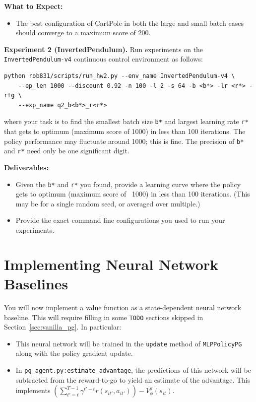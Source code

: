 \documentclass{article}
\begin{document}
\textbf{What to Expect:}
\begin{itemize}
\item The best configuration of CartPole in both the large and small batch cases should converge to a maximum score of 200.
\end{itemize}


\vspace{0.1in}
\textbf{Experiment 2 (InvertedPendulum).} Run experiments on the \verb|InvertedPendulum-v4| continuous control environment as follows:
\begin{lstlisting}
python rob831/scripts/run_hw2.py --env_name InvertedPendulum-v4 \
    --ep_len 1000 --discount 0.92 -n 100 -l 2 -s 64 -b <b*> -lr <r*> -rtg \
    --exp_name q2_b<b*>_r<r*>
\end{lstlisting}

where your task is to find the smallest batch size \texttt{b*} and largest learning rate \texttt{r*} that gets to optimum (maximum score of 1000) in less than 100 iterations. The policy performance may fluctuate around 1000; this is fine. The precision of \texttt{b*} and \texttt{r*} need only be one significant digit.

\textbf{Deliverables:}

\begin{itemize}
\item Given the \texttt{b*} and \texttt{r*} you found, provide a learning curve where the policy gets to optimum (maximum score of ~1000) in less than 100 iterations. (This may be for a single random seed, or averaged over multiple.)
\item Provide the exact command line configurations you used to run your experiments.
\end{itemize}

\section{Implementing Neural Network Baselines}
\label{sec:baseline}

You will now implement a value function as a state-dependent neural network baseline. This will require filling in some \texttt{TODO} sections skipped in Section~\ref{sec:vanilla_pg}. In particular:
\begin{itemize}
    \item This neural network will be trained in the \texttt{update} method of \texttt{MLPPolicyPG} along with the policy gradient update.
    \item In \texttt{pg\_agent.py:estimate\_advantage}, the predictions of this network will be subtracted from the reward-to-go to yield an estimate of the advantage. This implements $\left(\sum_{t'=t}^{T-1} \gamma^{t'-t} r(s_{it'}, a_{it'})\right) - V_\phi^\pi\left(s_{it}\right)$.
\end{itemize}
\end{document}
